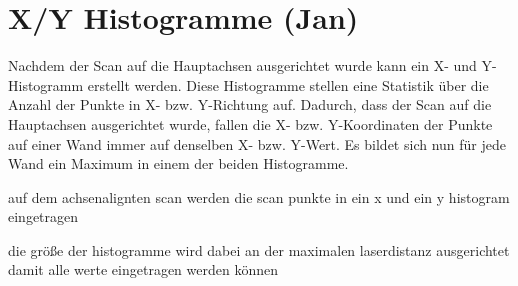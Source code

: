 \section{X/Y Histogramme (Jan)}

Nachdem der Scan auf die Hauptachsen ausgerichtet wurde kann ein X- und Y-Histogramm erstellt werden. Diese Histogramme stellen eine Statistik über die Anzahl der Punkte in X- bzw. Y-Richtung auf.
Dadurch, dass der Scan auf die Hauptachsen ausgerichtet wurde, fallen die X- bzw. Y-Koordinaten der Punkte auf einer Wand immer auf denselben X- bzw. Y-Wert. Es bildet sich nun für jede Wand ein Maximum in einem der beiden Histogramme.



auf dem achsenalignten scan werden die scan punkte in ein x und ein y histogram eingetragen

die größe der histogramme wird dabei an der maximalen laserdistanz ausgerichtet damit alle werte eingetragen werden können